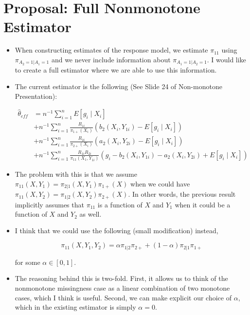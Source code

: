 \documentclass[12pt]{article}
\begin{document}
\newpage

\section*{Proposal: Full Nonmonotone Estimator}

\begin{itemize}

  \item When constructing
    estimates of the response model, we estimate $\pi_{11}$ using
    $\pi_{A_2 = 1|A_1 = 1}$ and we never include information about $\pi_{A_1 =
    1|A_2 = 1}$. I would like to create a full estimator where we are able to
    use this information.

  \item The current estimator is the following (See Slide 24 of Non-monotone
    Presentation):

    \begin{align*}
      \hat \theta_{eff} &= n^{-1} \sum_{i = 1}^n E[g_i \mid X_i] \\
      &+ n^{-1} \sum_{i = 1}^n \frac{R_{1i}}{\pi_{1+}(X_i)} (b_2(X_i, Y_{1i}) - 
      E[g_i \mid X_i]) \\
      &+ n^{-1} \sum_{i = 1}^n \frac{R_{2i}}{\pi_{2+}(X_i)} (a_2(X_i, Y_{2i}) -
      E[g_i \mid X_i]) \\
      &+ n^{-1} \sum_{i = 1}^n \frac{R_{1i} R_{2i}}{\pi_{11}(X_1, Y_{1i})}(g_i 
      - b_2(X_i, Y_{1i}) - a_2(X_i, Y_{2i}) + E[g_i \mid X_i])
    \end{align*}

  \item The problem with this is that we assume $\pi_{11}(X, Y_{1}) =
    \pi_{2|1} (X, Y_{1}) \pi_{1+}(X)$ when we could have $\pi_{11}(X, Y_2) =
    \pi_{1|2} (X, Y_2) \pi_{2+}(X)$. In other words, the previous result
    implicitly assumes that $\pi_{11}$ is a function of $X$ and $Y_1$ when it
    could be a function of $X$ and $Y_2$ as well. 

  \item I think that we could use the
    following (small modification) instead,

    \[\pi_{11}(X, Y_1, Y_2) = \alpha \pi_{1|2} \pi_{2+} + (1 - \alpha) \pi_{2|1}
    \pi_{1+}\]

    for some $\alpha \in [0, 1]$.
    
  \item The reasoning behind this is two-fold. First, it allows us to think of
    the nonmonotone missingness case as a linear combination of two monotone
    cases, which I think is useful. Second, we can make explicit our choice of
    $\alpha$, which in the existing estimator is simply $\alpha = 0$.


\end{itemize}
\end{document}
